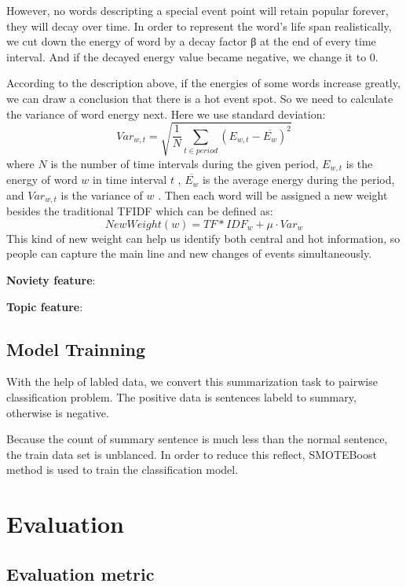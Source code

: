 \documentclass{llncs}
\begin{document}
However, no words descripting a special event point will retain popular forever, they will decay over time. In order to represent the word's life span realistically, we cut down the energy of word by a decay factor β at the end of every time interval. And if the decayed energy value became negative, we change it to 0.

According to the description above, if the energies of some words increase greatly, we can draw a conclusion that there is a hot event spot. So we need to calculate the variance of word energy next. Here we use standard deviation:
\begin{equation}
Var_{w,t} = \sqrt{ \frac{1}{N} \sum_{t \in period}(E_{w,t}- \overline{E_{w}})^2}
\end{equation}
where $N$ is the number of time intervals during the given period, $E_{w,t}$  is the energy of word $w$  in time interval $t$ , $\overline{E_{w}}$  is the average energy during the period, and $Var_{w,t}$  is the variance of $w$ .
Then each word will be assigned a new weight besides the traditional TFIDF which can be defined as:
 \begin{equation}
NewWeight(w)=TF*IDF_{w} + \mu \cdot Var_{w}
\end{equation}
This kind of new weight can help us identify both central and hot information, so people can capture the main line and new changes of events simultaneously.

\textbf{Noviety feature}: 

\textbf{Topic feature}: 


\subsection{Model Trainning}

With the help of labled data, we convert this summarization task to pairwise classification problem. The positive data is sentences labeld to summary, otherwise is negative. 

Because the count of summary sentence is much less than the normal sentence, the train data set is unblanced. In order to reduce this reflect, SMOTEBoost method is used to train the classification model.

%
\section{Evaluation}
%

\subsection{Evaluation metric}
\end{document}
